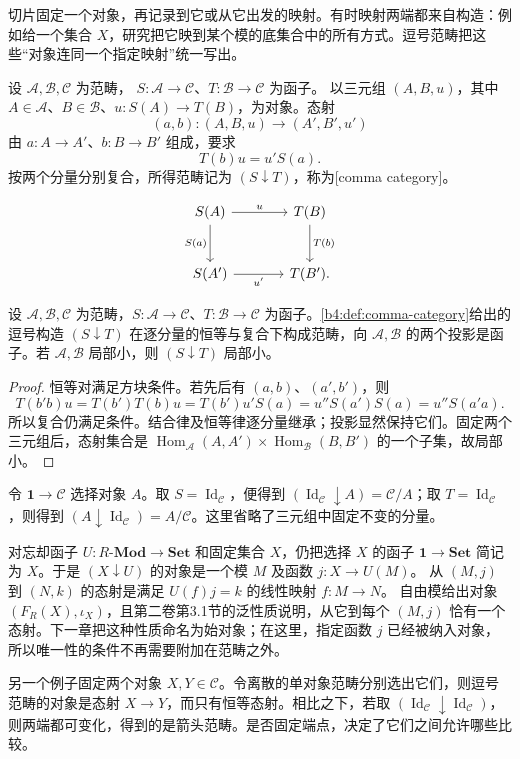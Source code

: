 \ProseParagraphBreak
切片固定一个对象，再记录到它或从它出发的映射。有时映射两端都来自构造：例如给一个集合 \(X\)，研究把它映到某个模的底集合中的所有方式。逗号范畴把这些“对象连同一个指定映射”统一写出。

\begin{definition}\label{b4:def:comma-category}
	设 \(\mathcal A,\mathcal B,\mathcal C\) 为范畴， \(S:\mathcal A\rightarrow\mathcal C\)、\(T:\mathcal B\rightarrow\mathcal C\) 为函子。 以三元组 \((A,B,u)\)，其中 \(A\in\mathcal A\)、\(B\in\mathcal B\)、\(u:S(A)\rightarrow T(B)\)，为对象。态射
	\[
		(a,b):(A,B,u)\longrightarrow(A',B',u')
	\]
	由 \(a:A\rightarrow A'\)、\(b:B\rightarrow B'\) 组成，要求
	\[
		T(b)u=u'S(a).
	\]
	按两个分量分别复合，所得范畴记为 \((S\downarrow T)\)，称为[comma category]。
\end{definition}

\[
	\begin{tikzcd}[column sep=large,row sep=large]
		S(A)\arrow[r,"u"]\arrow[d,"S(a)"']&T(B)\arrow[d,"T(b)"]\\
		S(A')\arrow[r,"u'"']&T(B').
	\end{tikzcd}
\]

\begin{proposition}\label{b4:prop:comma-category-construction}
	设 \(\mathcal A,\mathcal B,\mathcal C\) 为范畴，\(S:\mathcal A\rightarrow\mathcal C\)、\(T:\mathcal B\rightarrow\mathcal C\) 为函子。\cref{b4:def:comma-category}给出的逗号构造 \((S\downarrow T)\) 在逐分量的恒等与复合下构成范畴，向 \(\mathcal A,\mathcal B\) 的两个投影是函子。若 \(\mathcal A,\mathcal B\) 局部小，则 \((S\downarrow T)\) 局部小。
\end{proposition}
\begin{proof}
	恒等对满足方块条件。若先后有 \((a,b)\)、\((a',b')\)，则
	\[
		T(b'b)u=T(b')T(b)u =T(b')u'S(a) =u''S(a')S(a)=u''S(a'a).
	\]
	所以复合仍满足条件。结合律及恒等律逐分量继承；投影显然保持它们。固定两个三元组后，态射集合是 \(\operatorname{Hom}_{\mathcal A}(A,A')\times\operatorname{Hom}_{\mathcal B}(B,B')\) 的一个子集，故局部小。
\end{proof}

令 \(\mathbf1\rightarrow\mathcal C\) 选择对象 \(A\)。取 \(S=\operatorname{Id}_{\mathcal C}\)，便得到 \((\operatorname{Id}_{\mathcal C}\downarrow A)=\mathcal C/A\)；取 \(T=\operatorname{Id}_{\mathcal C}\)，则得到 \((A\downarrow\operatorname{Id}_{\mathcal C})=A/\mathcal C\)。这里省略了三元组中固定不变的分量。

\ProseParagraphBreak
对忘却函子 \(U:R\text{-}\mathbf{Mod}\rightarrow\mathbf{Set}\) 和固定集合 \(X\)，仍把选择 \(X\) 的函子 \(\mathbf1\rightarrow\mathbf{Set}\) 简记为 \(X\)。于是 \((X\downarrow U)\) 的对象是一个模 \(M\) 及函数 \(j:X\rightarrow U(M)\)。 从 \((M,j)\) 到 \((N,k)\) 的态射是满足 \(U(f)j=k\) 的线性映射 \(f:M\rightarrow N\)。 自由模给出对象 \((F_R(X),\iota_X)\)，且第二卷第3.1节的泛性质说明，从它到每个 \((M,j)\) 恰有一个态射。下一章把这种性质命名为始对象；在这里，指定函数 \(j\) 已经被纳入对象，所以唯一性的条件不再需要附加在范畴之外。

\ProseParagraphBreak
另一个例子固定两个对象 \(X,Y\in\mathcal C\)。令离散的单对象范畴分别选出它们，则逗号范畴的对象是态射 \(X\rightarrow Y\)，而只有恒等态射。相比之下，若取 \((\operatorname{Id}_{\mathcal C}\downarrow\operatorname{Id}_{\mathcal C})\)，则两端都可变化，得到的是箭头范畴。是否固定端点，决定了它们之间允许哪些比较。
